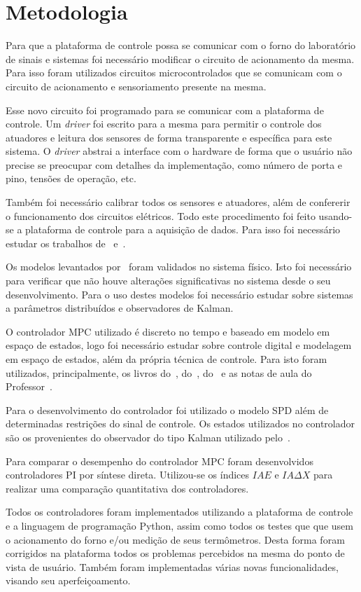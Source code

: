 
\chapter{Metodologia}%
\label{chp:methodology}

Para que a plataforma de controle possa se comunicar com o forno do laboratório
de sinais e sistemas foi necessário modificar o circuito de acionamento da
mesma. Para isso foram utilizados circuitos microcontrolados que se comunicam
com o circuito de acionamento e sensoriamento presente na mesma.

Esse novo circuito foi programado para se comunicar com a plataforma de
controle. Um \textit{driver} foi escrito para a mesma para permitir o controle
dos atuadores e leitura dos sensores de forma transparente e específica para
este sistema. O \textit{driver} abstrai a interface com o hardware de forma que
o usuário não precise se preocupar com detalhes da implementação, como número de
porta e pino, tensões de operação, etc.

Também foi necessário calibrar todos os sensores e atuadores, além de confererir
o funcionamento dos circuitos elétricos. Todo este procedimento foi feito
usando-se a plataforma de controle para a aquisição de dados. Para isso foi
necessário estudar os trabalhos de~\textcite{misc:nelson}
e~\textcite{misc:valle-silva}.

Os modelos levantados por~\textcite{masterthesis:nelson} foram validados no
sistema físico. Isto foi necessário para verificar que não houve alterações
significativas no sistema desde o seu desenvolvimento. Para o uso destes modelos
foi necessário estudar sobre sistemas a parâmetros distribuídos e observadores
de Kalman.

O controlador MPC utilizado é discreto no tempo e baseado em modelo em espaço de
estados, logo foi necessário estudar sobre controle digital e modelagem em
espaço de estados, além da própria técnica de controle. Para isto foram
utilizados, principalmente, os livros do~\textcite{book:dorf},
do~\textcite{book:ogata}, do~\textcite{book:wang} e as notas de aula do
Professor~\textcite{misc:patwardhan}.

Para o desenvolvimento do controlador foi utilizado o modelo SPD além de
determinadas restrições do sinal de controle. Os estados utilizados no
controlador são os provenientes do observador do tipo Kalman utilizado
pelo~\textcite{masterthesis:nelson}.

Para comparar o desempenho do controlador MPC foram desenvolvidos controladores
PI por síntese direta. Utilizou-se os índices \(IAE\) e \(IA\Delta{}X\) para
realizar uma comparação quantitativa dos controladores.

Todos os controladores foram implementados utilizando a plataforma de controle e
a linguagem de programação Python, assim como todos os testes que que usem o
acionamento do forno e/ou medição de seus termômetros. Desta forma foram
corrigidos na plataforma todos os problemas percebidos na mesma do ponto de
vista de usuário. Também foram implementadas várias novas funcionalidades,
visando seu aperfeiçoamento.
